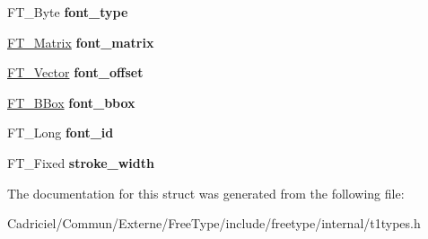\begin{DoxyCompactItemize}
\item 
F\+T\+\_\+\+Byte {\bfseries font\+\_\+type}\hypertarget{struct_t1___font_rec___a9d37e54d3a584f823dca80eca624f700}{}\label{struct_t1___font_rec___a9d37e54d3a584f823dca80eca624f700}

\item 
\hyperlink{struct_f_t___matrix__}{F\+T\+\_\+\+Matrix} {\bfseries font\+\_\+matrix}\hypertarget{struct_t1___font_rec___a87c95f084851d2bb9e48889e9444b2a8}{}\label{struct_t1___font_rec___a87c95f084851d2bb9e48889e9444b2a8}

\item 
\hyperlink{struct_f_t___vector__}{F\+T\+\_\+\+Vector} {\bfseries font\+\_\+offset}\hypertarget{struct_t1___font_rec___ab6e773e20df1c585dc14ee3fa7ed1737}{}\label{struct_t1___font_rec___ab6e773e20df1c585dc14ee3fa7ed1737}

\item 
\hyperlink{struct_f_t___b_box__}{F\+T\+\_\+\+B\+Box} {\bfseries font\+\_\+bbox}\hypertarget{struct_t1___font_rec___a86fd1af4c03e34b7d151054ccc7525a7}{}\label{struct_t1___font_rec___a86fd1af4c03e34b7d151054ccc7525a7}

\item 
F\+T\+\_\+\+Long {\bfseries font\+\_\+id}\hypertarget{struct_t1___font_rec___a14178cf438d1a5fcb31b7d398d06cfaf}{}\label{struct_t1___font_rec___a14178cf438d1a5fcb31b7d398d06cfaf}

\item 
F\+T\+\_\+\+Fixed {\bfseries stroke\+\_\+width}\hypertarget{struct_t1___font_rec___ac71ace1872be6b2adbd3d6f5ca456d23}{}\label{struct_t1___font_rec___ac71ace1872be6b2adbd3d6f5ca456d23}

\end{DoxyCompactItemize}


The documentation for this struct was generated from the following file\+:\begin{DoxyCompactItemize}
\item 
Cadriciel/\+Commun/\+Externe/\+Free\+Type/include/freetype/internal/t1types.\+h\end{DoxyCompactItemize}
